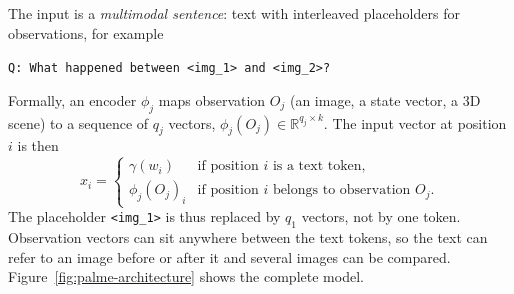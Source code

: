 The input is a \emph{multimodal sentence}: text with interleaved
placeholders for observations, for example
\begin{center}
  \texttt{Q: What happened between <img\_1> and <img\_2>?}
\end{center}
\noindent
Formally, an encoder $\phi_j$ maps observation $O_j$ (an image, a state
vector, a 3D scene) to a sequence of $q_j$ vectors,
$\phi_j(O_j)\in\mathbb R^{q_j\times k}$. The input vector at position $i$ is
then
\begin{equation}
  x_i =
  \begin{cases}
    \gamma(w_i) & \text{if position } i \text{ is a text token},\\
    \phi_j(O_j)_i & \text{if position } i \text{ belongs to observation } O_j .
  \end{cases}
  \label{eq:mllm-multimodal-sentence}
\end{equation}
\noindent
The placeholder \texttt{<img\_1>} is thus replaced by $q_1$ vectors, not by
one token. Observation vectors can sit anywhere between the text tokens, so
the text can refer to an image before or after it and several images can be
compared. Figure~\ref{fig:palme-architecture} shows the complete model.

